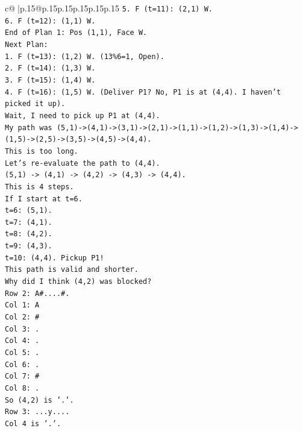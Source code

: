 \documentclass{article}
\begin{document}
{\begin{supertabular}{c@{$\;$}|p{.15\linewidth}@{}p{.15\linewidth}p{.15\linewidth}p{.15\linewidth}p{.15\linewidth}p{.15\linewidth}}
{{{\texttt{5. F (t=11): (2,1) W.} \\
\texttt{6. F (t=12): (1,1) W.} \\
\texttt{End of Plan 1: Pos (1,1), Face W.} \\
\texttt{Next Plan:} \\
\texttt{1. F (t=13): (1,2) W. (13\%6=1, Open).} \\
\texttt{2. F (t=14): (1,3) W.} \\
\texttt{3. F (t=15): (1,4) W.} \\
\texttt{4. F (t=16): (1,5) W. (Deliver P1? No, P1 is at (4,4). I haven't picked it up).} \\
\texttt{Wait, I need to pick up P1 at (4,4).} \\
\texttt{My path was (5,1){-}>(4,1){-}>(3,1){-}>(2,1){-}>(1,1){-}>(1,2){-}>(1,3){-}>(1,4){-}>(1,5){-}>(2,5){-}>(3,5){-}>(4,5){-}>(4,4).} \\
\texttt{This is too long.} \\
\texttt{Let's re{-}evaluate the path to (4,4).} \\
\texttt{(5,1) {-}> (4,1) {-}> (4,2) {-}> (4,3) {-}> (4,4).} \\
\texttt{This is 4 steps.} \\
\texttt{If I start at t=6.} \\
\texttt{t=6: (5,1).} \\
\texttt{t=7: (4,1).} \\
\texttt{t=8: (4,2).} \\
\texttt{t=9: (4,3).} \\
\texttt{t=10: (4,4). Pickup P1!} \\
\texttt{This path is valid and shorter.} \\
\texttt{Why did I think (4,2) was blocked?} \\
\texttt{Row 2: A\#....\#.} \\
\texttt{Col 1: A} \\
\texttt{Col 2: \#} \\
\texttt{Col 3: .} \\
\texttt{Col 4: .} \\
\texttt{Col 5: .} \\
\texttt{Col 6: .} \\
\texttt{Col 7: \#} \\
\texttt{Col 8: .} \\
\texttt{So (4,2) is '.'.} \\
\texttt{Row 3: ...y....} \\
\texttt{Col 4 is '.'.} \\
}}}
\end{supertabular}}
\end{document}
